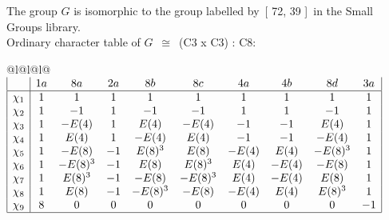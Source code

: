 \documentclass[varwidth=\maxdimen,border=10]{standalone}
\begin{document}
The group $G$ is isomorphic to the group labelled by\ [ 72, 39 ]\ in the Small Groups library.\\
Ordinary character table of $G$\ $\cong$\ (C3 x C3) : C8:\\
\begin{center}
\begin{tabular}{@{}l@{}l@{}l@{}}
\hline
\(\begin{array}{|l|ccccccccc|}
  & 1a & 8a & 2a & 8b & 8c & 4a & 4b & 8d & 3a\\ \hline
\chi_{1} & 1 & 1 & 1 & 1 & 1 & 1 & 1 & 1 & 1\\
\chi_{2} & 1 & -1 & 1 & -1 & -1 & 1 & 1 & -1 & 1\\
\chi_{3} & 1 & -E(4) & 1 & E(4) & -E(4) & -1 & -1 & E(4) & 1\\
\chi_{4} & 1 & E(4) & 1 & -E(4) & E(4) & -1 & -1 & -E(4) & 1\\
\chi_{5} & 1 & -E(8) & -1 & E(8)^{3} & E(8) & -E(4) & E(4) & -E(8)^{3} & 1\\
\chi_{6} & 1 & -E(8)^{3} & -1 & E(8) & E(8)^{3} & E(4) & -E(4) & -E(8) & 1\\
\chi_{7} & 1 & E(8)^{3} & -1 & -E(8) & -E(8)^{3} & E(4) & -E(4) & E(8) & 1\\
\chi_{8} & 1 & E(8) & -1 & -E(8)^{3} & -E(8) & -E(4) & E(4) & E(8)^{3} & 1\\
\chi_{9} & 8 & 0 & 0 & 0 & 0 & 0 & 0 & 0 & -1\\
\hline
\end{array}\)\\
\end{tabular}
\end{center}
\end{document}

